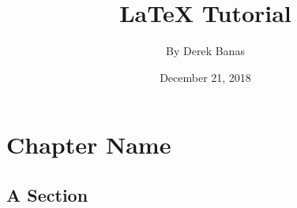 \documentclass[a4paper,12pt]{book}
\begin{document}
\title{\Large{\textbf{LaTeX Tutorial}}}
\author{By Derek Banas}
\date{December 21, 2018}
 
\maketitle
\let\cleardoublepage\clearpage
 
 
\tableofcontents
 
 
 
 
 
\pagestyle{fancy}
 
\fancyhf{}
 
 
\renewcommand{\headrulewidth}{2pt}
\renewcommand{\footrulewidth}{1pt}
 
 
 
 
\fancyhead[LE]{\leftmark}
 
 
 
\fancyhead[RO]{\nouppercase{\rightmark}}
 
 
\fancyfoot[LE,RO]{\thepage}
 
 
\chapter{Chapter Name}
\blindtext
\section{A Section}
 
 
\blindmathtrue
 
 
\end{document}

